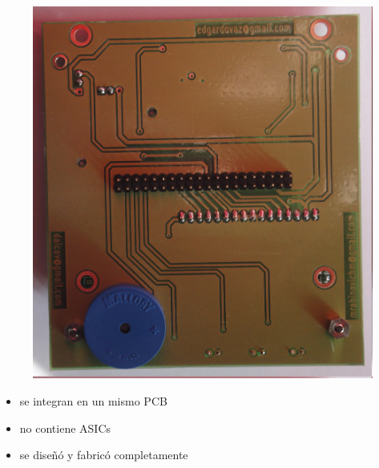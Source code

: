 \documentclass{beamer}
\begin{document}
\begin{frame}
\begin{figure}
{			\includegraphics[scale=.033]{Imagenes/SCUI_b.jpg} }
	\end{figure}

	\begin{itemize}
		\item se integran en un mismo PCB
		
		\bigskip		
		\item no contiene ASICs

		\bigskip
		\item se diseñó y fabricó completamente
	\end{itemize}
\end{frame}
\end{document}
